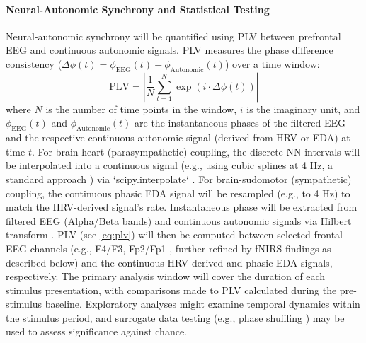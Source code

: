\documentclass[12pt]{article} %
\begin{document}
\paragraph{Neural-Autonomic Synchrony and Statistical Testing}
Neural-autonomic synchrony will be quantified using \gls{PLV} \parencite{lachauxMeasuringPhaseSynchrony1999} between prefrontal \gls{EEG} and continuous autonomic signals. \gls{PLV} measures the phase difference consistency ($\Delta\phi(t) = \phi_{\text{EEG}}(t) - \phi_{\text{Autonomic}}(t)$) over a time window:
\begin{equation}
    \text{PLV} = \left| \frac{1}{N} \sum_{t=1}^{N} \exp(i \cdot \Delta\phi(t)) \right|
    \label{eq:plv} %
\end{equation}
where $N$ is the number of time points in the window, $i$ is the imaginary unit, and $\phi_{\text{EEG}}(t)$ and $\phi_{\text{Autonomic}}(t)$ are the instantaneous phases of the filtered \gls{EEG} and the respective continuous autonomic signal (derived from \gls{HRV} or \gls{EDA}) at time $t$. For brain-heart (parasympathetic) coupling, the discrete \gls{NN intervals} will be interpolated into a continuous signal (e.g., using cubic splines at 4 Hz, a standard approach \parencite{lagunaPowerSpectralDensity1998, shafferOverviewHeartRate2017}) via `scipy.interpolate` \parencite{virtanenSciPy10Fundamental2020}. For brain-sudomotor (sympathetic) coupling, the continuous phasic \gls{EDA} signal will be resampled (e.g., to 4 Hz) to match the \gls{HRV}-derived signal's rate. Instantaneous phase will be extracted from filtered \gls{EEG} (Alpha/Beta bands) and continuous autonomic signals via Hilbert transform \parencite{virtanenSciPy10Fundamental2020}. \gls{PLV} (see \autoref{eq:plv}) will then be computed between selected frontal \gls{EEG} channels (e.g., F4/F3, Fp2/Fp1 \parencite{rodriguesMethodsMatterExamination2021}, further refined by \gls{fNIRS} findings as described below) and the continuous \gls{HRV}-derived and phasic \gls{EDA} signals, respectively. The primary analysis window will cover the duration of each stimulus presentation, with comparisons made to \gls{PLV} calculated during the pre-stimulus baseline. Exploratory analyses might examine temporal dynamics within the stimulus period, and surrogate data testing (e.g., phase shuffling \parencite{cohenAnalyzingNeuralTime2014}) may be used to assess significance against chance.
\end{document}
